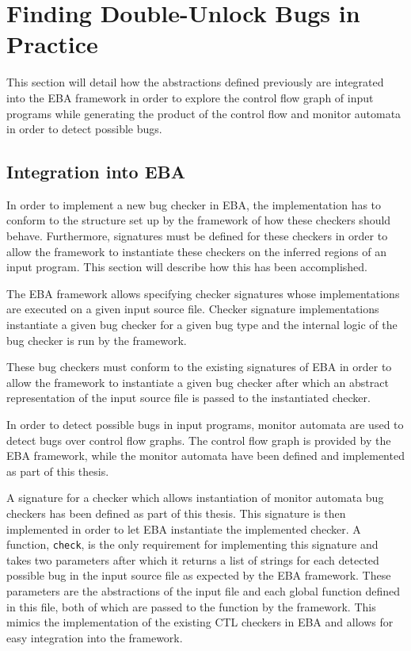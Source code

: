 \section{Finding Double-Unlock Bugs in Practice}
\label{implementation}

\noindent This section will detail how the abstractions defined previously are integrated into the EBA framework in order to explore the control flow graph of input programs while generating the product of the control flow and monitor automata in order to detect possible bugs. 

\subsection{Integration into EBA}
\label{integration-into-eba}

\noindent In order to implement a new bug checker in EBA, the implementation has to conform to the structure set up by the framework of how these checkers should behave. Furthermore, signatures must be defined for these checkers in order to allow the framework to instantiate these checkers on the inferred regions of an input program. This section will describe how this has been accomplished.  

\newpar The EBA framework allows specifying checker signatures whose implementations are executed on a given input source file. Checker signature implementations instantiate a given bug checker for a given bug type and the internal logic of the bug checker is run by the framework. 

\newpar These bug checkers must conform to the existing signatures of EBA in order to allow the framework to instantiate a given bug checker after which an abstract representation of the input source file is passed to the instantiated checker. 

\newpar In order to detect possible bugs in input programs, monitor automata are used to detect bugs over control flow graphs. The control flow graph is provided by the EBA framework, while the monitor automata have been defined and implemented as part of this thesis. 

\newpar A signature for a checker which allows instantiation of monitor automata bug checkers has been defined as part of this thesis. This signature is then implemented in order to let EBA instantiate the implemented checker. A function, \texttt{check}, is the only requirement for implementing this signature and takes two parameters after which it returns a list of strings for each detected possible bug in the input source file as expected by the EBA framework. These parameters are the abstractions of the input file and each global function defined in this file, both of which are passed to the function by the framework. This mimics the implementation of the existing CTL checkers in EBA and allows for easy integration into the framework. 

